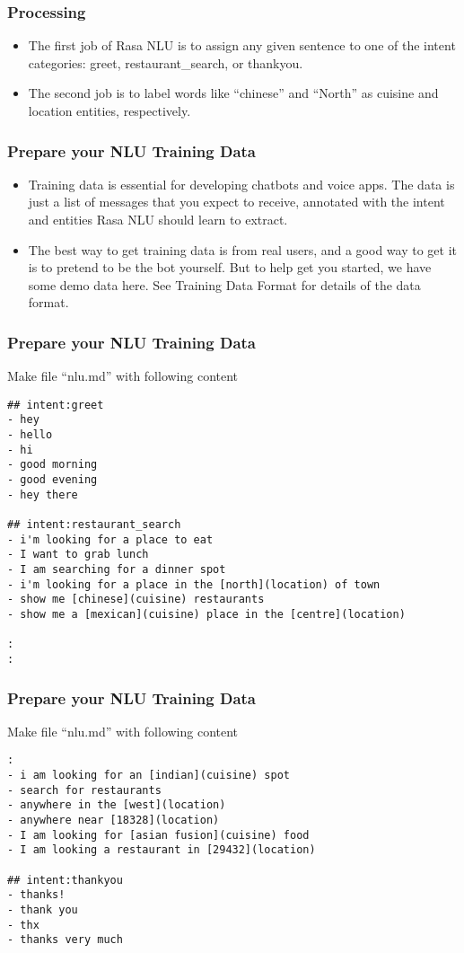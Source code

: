  \begin{frame}[fragile]\frametitle{Processing}
\begin{itemize}
\item The first job of Rasa NLU is to assign any given sentence to one of the intent categories: greet, restaurant\_search, or thankyou.
\item The second job is to label words like ``chinese'' and ``North'' as cuisine and location entities, respectively. 
\end{itemize}
\end{frame}

 \begin{frame}[fragile]\frametitle{Prepare your NLU Training Data}
\begin{itemize}
\item Training data is essential for developing chatbots and voice apps. The data is just a list of messages that you expect to receive, annotated with the intent and entities Rasa NLU should learn to extract.
\item The best way to get training data is from real users, and a good way to get it is to pretend to be the bot yourself. But to help get you started, we have some demo data here. See Training Data Format for details of the data format.
\end{itemize}
\end{frame}

 \begin{frame}[fragile]\frametitle{Prepare your NLU Training Data}
 Make file ``nlu.md'' with following content
 \scriptsize
\begin{lstlisting}
## intent:greet
- hey
- hello
- hi
- good morning
- good evening
- hey there

## intent:restaurant_search
- i'm looking for a place to eat
- I want to grab lunch
- I am searching for a dinner spot
- i'm looking for a place in the [north](location) of town
- show me [chinese](cuisine) restaurants
- show me a [mexican](cuisine) place in the [centre](location)

:
:
\end{lstlisting}
\end{frame}

 \begin{frame}[fragile]\frametitle{Prepare your NLU Training Data}
 Make file ``nlu.md'' with following content
 \scriptsize
\begin{lstlisting}
:
- i am looking for an [indian](cuisine) spot
- search for restaurants
- anywhere in the [west](location)
- anywhere near [18328](location)
- I am looking for [asian fusion](cuisine) food
- I am looking a restaurant in [29432](location)

## intent:thankyou
- thanks!
- thank you
- thx
- thanks very much
\end{lstlisting}
\end{frame}


